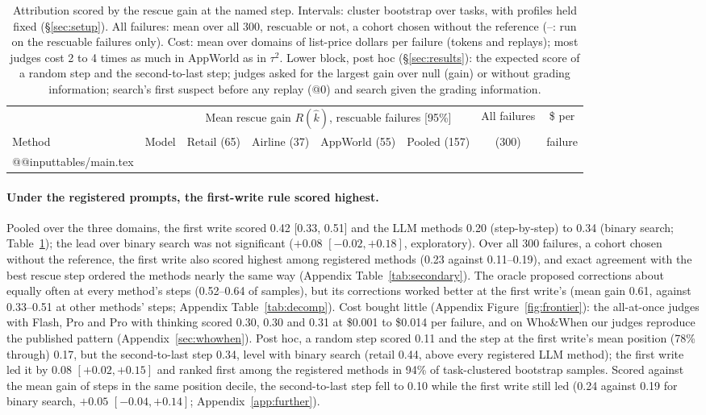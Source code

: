 \documentclass[11pt]{article}
\newcommand{\Rhat}{R(\hat{k})}
\begin{document}
\begin{table}[t]
\centering
\small
\setlength{\tabcolsep}{1.8pt}
\begin{tabular}{llcccccc}
\toprule
 & & \multicolumn{4}{c}{Mean rescue gain $\Rhat$, rescuable failures [95\%]} & All failures & \$ per \\
\cmidrule(lr){3-6}
Method & Model & Retail (65) & Airline (37) & AppWorld (55) & Pooled (157) & (300) & failure \\
\midrule
\csname @@input\endcsname tables/main.tex
\bottomrule
\end{tabular}
\caption{Attribution scored by the rescue gain at the named step. Intervals: cluster bootstrap over tasks, with profiles held fixed (\S\ref{sec:setup}). All failures: mean over all 300, rescuable or not, a cohort chosen without the reference (--: run on the rescuable failures only). Cost: mean over domains of list-price dollars per failure (tokens and replays); most judges cost 2 to 4 times as much in AppWorld as in $\tau^2$. Lower block, post hoc (\S\ref{sec:results}): the expected score of a random step and the second-to-last step; judges asked for the largest gain over null (gain) or without grading information; search's first suspect before any replay (@0) and search given the grading information.}
\label{tab:main}
\end{table}

\paragraph{Under the registered prompts, the first-write rule scored highest.} Pooled over the three domains, the first write scored 0.42 [0.33, 0.51] and the LLM methods 0.20 (step-by-step) to 0.34 (binary search; Table~\ref{tab:main}); the lead over binary search was not significant ($+0.08$ $[-0.02,+0.18]$, exploratory). Over all 300 failures, a cohort chosen without the reference, the first write also scored highest among registered methods (0.23 against 0.11--0.19), and exact agreement with the best rescue step ordered the methods nearly the same way (Appendix Table~\ref{tab:secondary}). The oracle proposed corrections about equally often at every method's steps (0.52--0.64 of samples), but its corrections worked better at the first write's (mean gain 0.61, against 0.33--0.51 at other methods' steps; Appendix Table~\ref{tab:decomp}). Cost bought little (Appendix Figure~\ref{fig:frontier}): the all-at-once judges with Flash, Pro and Pro with thinking scored 0.30, 0.30 and 0.31 at \$0.001 to \$0.014 per failure, and on Who\&When our judges reproduce the published pattern (Appendix~\ref{sec:whowhen}). Post hoc, a random step scored 0.11 and the step at the first write's mean position (78\% through) 0.17, but the second-to-last step 0.34, level with binary search (retail 0.44, above every registered LLM method); the first write led it by 0.08 $[+0.02,+0.15]$ and ranked first among the registered methods in 94\% of task-clustered bootstrap samples. Scored against the mean gain of steps in the same position decile, the second-to-last step fell to 0.10 while the first write still led (0.24 against 0.19 for binary search, $+0.05$ $[-0.04,+0.14]$; Appendix~\ref{app:further}).
\end{document}
